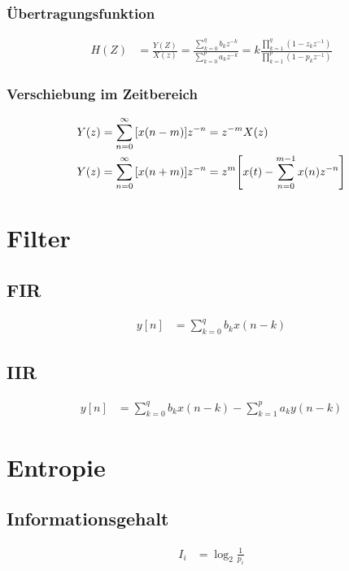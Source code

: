 \documentclass[10pt,a4paper]{article}
\begin{document}
  \subsubsection{Übertragungsfunktion}
  \begin{mdframed}[style=exercise]
    \begin{align}
      H(Z) &=\frac{Y(Z)}{X(z)}=\frac{\sum_{k=0}^q b_k z^{-k}}{\sum_{k=0}^p a_k z^{-k}}=k\frac{\prod_{k=1}^q (1-z_k z^{-1})}{\prod_{k=1}^p (1-p_k z^{-1})}
    \end{align}
  \end{mdframed}
  \subsubsection{Verschiebung im Zeitbereich}
  \begin{mdframed}[style=exercise]
    \begin{align}
      Y(z) &= \sum_{n=0}^{\infty} \qty[x(n-m)] z^{-n} =  z^{-m} X(z)\\
      Y(z) &= \sum_{n=0}^{\infty}\qty[x(n+m)]z^{-n} = z^{m}\qty[x(t)-\sum_{n=0}^{m-1} x(n) z^{-n}]
    \end{align}
  \end{mdframed}
  \section{Filter}
  \subsection{FIR}
  \begin{mdframed}[style=exercise]
    \begin{align}
      y[n] &= \sum_{k=0}^{q} b_k x(n-k)
    \end{align}
  \end{mdframed}
  \subsection{IIR}
  \begin{mdframed}[style=exercise]
    \begin{align}
      y[n] &= \sum_{k=0}^{q} b_k x(n-k) - \sum_{k=1}^{p} a_k y(n-k)
    \end{align}
  \end{mdframed}
  \section{Entropie}
  \subsection{Informationsgehalt}
  \begin{mdframed}[style=exercise]
    \begin{align}
      I_i &= \log_2 \frac{1}{p_i}
    \end{align}
  \end{mdframed}
\end{document}
